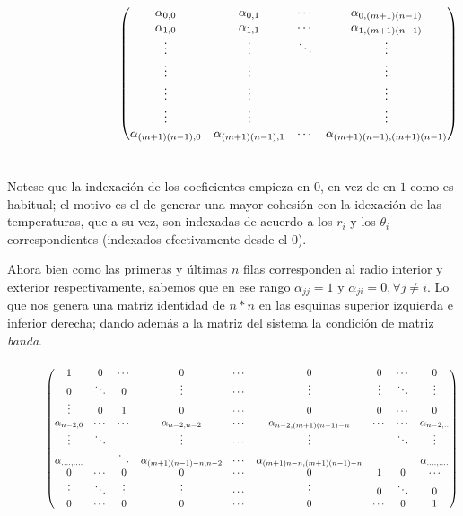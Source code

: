 $
\hspace{3.2cm}
     \begin{pmatrix}
      \alpha_{0,0} & \alpha_{0,1} & \cdots & \alpha_{0,(m+1)(n-1)} \\
      \alpha_{1,0} & \alpha_{1,1} & \cdots & \alpha_{1,(m+1)(n-1)} \\
      \vdots  & \vdots  & \ddots & \vdots \\
      \vdots  & \vdots  &        & \vdots \\
      \vdots  & \vdots  &        & \vdots \\
      \vdots  & \vdots  &        & \vdots \\
      \alpha_{(m+1)(n-1),0} & \alpha_{(m+1)(n-1),1} & \cdots & \alpha_{(m+1)(n-1),(m+1)(n-1)} 
     \end{pmatrix}
$
\\
\\
\\
Notese que la indexaci\'on de los coeficientes empieza en $0$, en vez de en $1$ como es habitual; el motivo es el de generar una mayor cohesi\'on con la idexaci\'on de las temperaturas, que a su vez, son indexadas de acuerdo a los $r_i$ y los $\theta_i$ correspondientes (indexados efectivamente desde el $0$).

Ahora bien como las primeras y \'ultimas $n$ filas corresponden al radio interior y exterior respectivamente, sabemos que en ese rango $\alpha_{jj} = 1$ y $\alpha_{ji} = 0, \forall j \neq i$. Lo que nos genera una matriz identidad de $n*n$ en las esquinas superior izquierda e inferior derecha; dando adem\'as a la matriz del sistema la condici\'on de matriz \textit{banda}.
\\
\\

$
\hspace{1.3cm}
     \begin{pmatrix}
      1 & 0 & \cdots & 0 & \cdots & 0 & 0 & \cdots & 0 \\
      0 & \ddots & 0 & \vdots & \cdots & \vdots & \vdots & \ddots & \vdots \\   
      \vdots  & 0  & 1 & 0 & \cdots & 0 & 0 & \cdots & 0 \\
      \alpha_{n-2,0} & \cdots & \cdots & \alpha_{n-2,n-2} & \cdots & \alpha_{n-2,(m+1)(n-1)-n} & \cdots & \cdots & \alpha_{n-2,..} \\
      \vdots  & \ddots  &  & \vdots & \cdots & \vdots &  & \ddots & \vdots \\        
      \alpha_{....,....} &  &\ddots & \alpha_{(m+1)(n-1)-n, n-2} & \cdots & \alpha_{(m+1)n-n,(m+1)(n-1)-n} & & & \alpha_{....,....}  \\
      0 & \cdots & 0 & 0 & \cdots & 0 & 1 & 0 & \cdots  \\
      \vdots & \ddots & \vdots & \vdots & \cdots & \vdots & 0 & \ddots & 0 \\
      0 & \cdots & 0 & 0 & \cdots  & 0 & \cdots & 0 & 1 
     \end{pmatrix}
$

